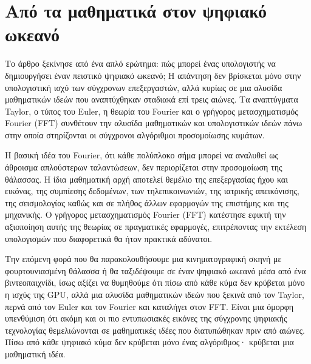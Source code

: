 \section{Από τα μαθηματικά στον ψηφιακό
ωκεανό}\label{ux3b1ux3c0ux3cc-ux3c4ux3b1-ux3bcux3b1ux3b8ux3b7ux3bcux3b1ux3c4ux3b9ux3baux3ac-ux3c3ux3c4ux3bfux3bd-ux3c8ux3b7ux3c6ux3b9ux3b1ux3baux3cc-ux3c9ux3baux3b5ux3b1ux3bdux3cc}

Το άρθρο ξεκίνησε από ένα απλό ερώτημα: πώς μπορεί ένας υπολογιστής να
δημιουργήσει έναν πειστικό ψηφιακό ωκεανό; Η απάντηση δεν βρίσκεται μόνο
στην υπολογιστική ισχύ των σύγχρονων επεξεργαστών, αλλά κυρίως σε μια
αλυσίδα μαθηματικών ιδεών που αναπτύχθηκαν σταδιακά επί τρεις αιώνες. Τα
αναπτύγματα Taylor, ο τύπος του Euler, η θεωρία του Fourier και ο
γρήγορος μετασχηματισμός Fourier (FFT) συνθέτουν την αλυσίδα μαθηματικών
και υπολογιστικών ιδεών πάνω στην οποία στηρίζονται οι σύγχρονοι
αλγόριθμοι προσομοίωσης κυμάτων.

Η βασική ιδέα του Fourier, ότι κάθε πολύπλοκο σήμα μπορεί να αναλυθεί ως
άθροισμα απλούστερων ταλαντώσεων, δεν περιορίζεται στην προσομοίωση της
θάλασσας. Η ίδια μαθηματική αρχή αποτελεί θεμέλιο της επεξεργασίας ήχου
και εικόνας, της συμπίεσης δεδομένων, των τηλεπικοινωνιών, της ιατρικής
απεικόνισης, της σεισμολογίας καθώς και σε πλήθος άλλων εφαρμογών της
επιστήμης και της μηχανικής. Ο γρήγορος μετασχηματισμός Fourier (FFT)
κατέστησε εφικτή την αξιοποίηση αυτής της θεωρίας σε πραγματικές
εφαρμογές, επιτρέποντας την εκτέλεση υπολογισμών που διαφορετικά θα ήταν
πρακτικά αδύνατοι.

Την επόμενη φορά που θα παρακολουθήσουμε μια κινηματογραφική σκηνή με
φουρτουνιασμένη θάλασσα ή θα ταξιδέψουμε σε έναν ψηφιακό ωκεανό μέσα από
ένα βιντεοπαιχνίδι, ίσως αξίζει να θυμηθούμε ότι πίσω από κάθε κύμα δεν
κρύβεται μόνο η ισχύς της GPU, αλλά μια αλυσίδα μαθηματικών ιδεών που
ξεκινά από τον Taylor, περνά από τον Euler και τον Fourier και καταλήγει
στον FFT. Είναι μια όμορφη υπενθύμιση ότι ακόμη και οι πιο εντυπωσιακές
εικόνες της σύγχρονης ψηφιακής τεχνολογίας θεμελιώνονται σε μαθηματικές
ιδέες που διατυπώθηκαν πριν από αιώνες. Πίσω από κάθε ψηφιακό κύμα δεν
κρύβεται μόνο ένας αλγόριθμος· κρύβεται μια μαθηματική ιδέα.

